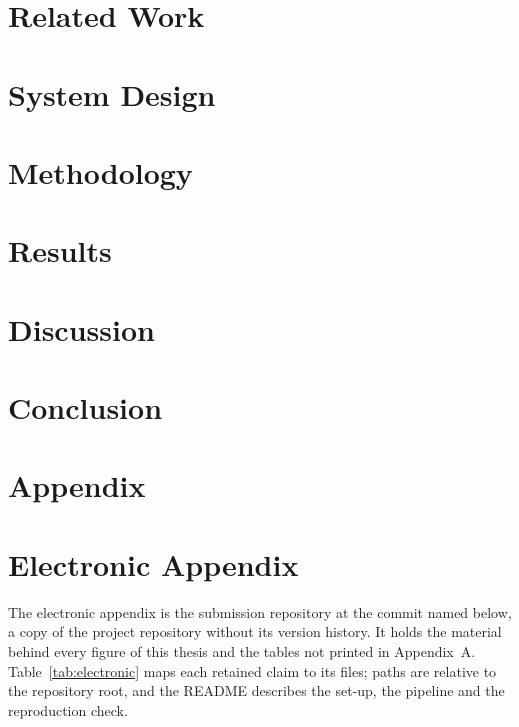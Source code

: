 \documentclass[12pt, a4paper]{article}
\theoremstyle{definition}
\begin{document}
\section{Related Work}\label{sec:related_work}


\section{System Design}\label{sec:system_design}


\section{Methodology}\label{sec:methodology}


\section{Results}\label{sec:results}


\section{Discussion}\label{sec:discussion}


\section{Conclusion}\label{sec:conclusion}


\newpage
{}
\setcounter{page}{\value{frontmatterpages}} %
\begingroup
\raggedright
\setlength{\emergencystretch}{3em} %
\printbibliography[title={References}, heading=bibintoc]
\endgroup

\appendix
\section{Appendix}\label{app:main}


\newpage
\section{Electronic Appendix}\label{app:electronic}
The electronic appendix is the submission repository at the commit named below, a copy of the project repository without its version history. It holds the material behind every figure of this thesis and the tables not printed in Appendix~A. Table~\ref{tab:electronic} maps each retained claim to its files; paths are relative to the repository root, and the README describes the set-up, the pipeline and the reproduction check.
\end{document}

